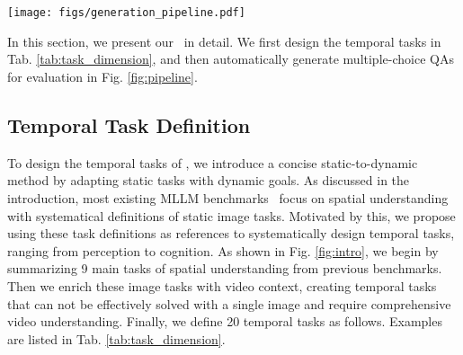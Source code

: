 \section{\BenchName}
\label{sec:mvpbench}

\begin{figure*}[thp]
    \centering
    \texttt{[image: figs/generation\_pipeline.pdf]}
    \vspace{-0.3cm}
    \caption{
    \textbf{Generation pipeline of \BenchName.} 
    Within public annotations, 
    data is carefully filtered and relevant multiple-choice QAs are auto-generated.
    The effective system prompt and efficient answer prompt are employed to guide MLLMs toward precise outputs.
    }
    \label{fig:pipeline}
    \vspace{-0.3cm}
\end{figure*}

In this section, 
we present our \BenchName\ in detail. 
We first design the temporal tasks in Tab. \ref{tab:task_dimension},
and then automatically generate multiple-choice QAs for evaluation in Fig. \ref{fig:pipeline}.

\subsection{Temporal Task Definition}
\label{sec:dimension}

To design the temporal tasks of \BenchName, 
we introduce a concise static-to-dynamic method by adapting static tasks with dynamic goals.
As discussed in the introduction,
most existing MLLM benchmarks~\cite{mme,mmbench} focus on spatial understanding with systematical definitions of static image tasks.
Motivated by this, 
we propose using these task definitions as references to systematically design temporal tasks, ranging from perception to cognition.
As shown in Fig. \ref{fig:intro}, 
we begin by summarizing 9 main tasks of spatial understanding from previous benchmarks. 
Then we enrich these image tasks with video context, 
creating temporal tasks that can not be effectively solved with a single image and require comprehensive video understanding. 
Finally, 
we define 20 temporal tasks as follows. 
Examples are listed in Tab. \ref{tab:task_dimension}.

